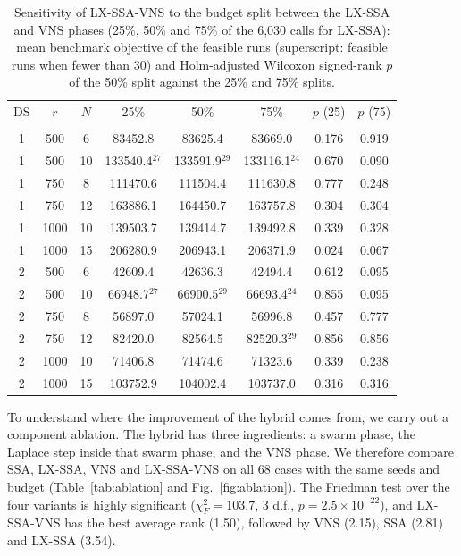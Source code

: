 \documentclass[journal,twoside]{IEEEtran}
\begin{document}
\begin{table}[!t]
\centering
\caption{Sensitivity of LX-SSA-VNS to the budget split between the LX-SSA and VNS phases (25\%, 50\% and 75\% of the 6,030 calls for LX-SSA): mean benchmark objective of the feasible runs (superscript: feasible runs when fewer than 30) and Holm-adjusted Wilcoxon signed-rank $p$ of the 50\% split against the 25\% and 75\% splits.}
\label{tab:split}
\scriptsize\setlength{\tabcolsep}{2.5pt}
\begin{tabular}{cccccccc}
\toprule
DS & $r$ & $N$ & 25\% & 50\% & 75\% & $p$ (25) & $p$ (75) \\\\
\midrule
1 & 500 & 6 & 83452.8 & 83625.4 & 83669.0 & 0.176 & 0.919 \\
1 & 500 & 10 & 133540.4$^{27}$ & 133591.9$^{29}$ & 133116.1$^{24}$ & 0.670 & 0.090 \\
1 & 750 & 8 & 111470.6 & 111504.4 & 111630.8 & 0.777 & 0.248 \\
1 & 750 & 12 & 163886.1 & 164450.7 & 163757.8 & 0.304 & 0.304 \\
1 & 1000 & 10 & 139503.7 & 139414.7 & 139492.8 & 0.339 & 0.328 \\
1 & 1000 & 15 & 206280.9 & 206943.1 & 206371.9 & 0.024 & 0.067 \\
2 & 500 & 6 & 42609.4 & 42636.3 & 42494.4 & 0.612 & 0.095 \\
2 & 500 & 10 & 66948.7$^{27}$ & 66900.5$^{29}$ & 66693.4$^{24}$ & 0.855 & 0.095 \\
2 & 750 & 8 & 56897.0 & 57024.1 & 56996.8 & 0.457 & 0.777 \\
2 & 750 & 12 & 82420.0 & 82564.5 & 82520.3$^{29}$ & 0.856 & 0.856 \\
2 & 1000 & 10 & 71406.8 & 71474.6 & 71323.6 & 0.339 & 0.238 \\
2 & 1000 & 15 & 103752.9 & 104002.4 & 103737.0 & 0.316 & 0.316 \\
\bottomrule
\end{tabular}
\end{table}

To understand where the improvement of the hybrid comes from, we carry out a component ablation. The hybrid has three ingredients: a swarm phase, the Laplace step inside that swarm phase, and the VNS phase. We therefore compare SSA, LX-SSA, VNS and LX-SSA-VNS on all 68 cases with the same seeds and budget (Table~\ref{tab:ablation} and Fig.~\ref{fig:ablation}). The Friedman test over the four variants is highly significant ($\chi^2_F=103.7$, 3 d.f., $p=2.5\times10^{-22}$), and LX-SSA-VNS has the best average rank (1.50), followed by VNS (2.15), SSA (2.81) and LX-SSA (3.54).
\end{document}
